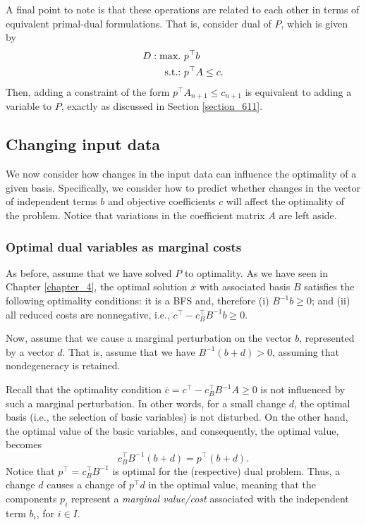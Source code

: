 A final point to note is that these operations are related to each other in terms of equivalent primal-dual formulations. That is, consider dual of $P$, which is given by
%
\begin{align*}
	D : \mathop{\text{max.~}}   & p^\top b \\
	\mathop{\text{s.t.:~}} 			& p^\top A \le c.
\end{align*}
%
Then, adding a constraint of the form $p^\top A_{n+1} \leq c_{n+1}$ is equivalent to adding a variable to $P$, exactly as discussed in Section \ref{section_611}.


\subsection{Changing input data} \label{section_613}

We now consider how changes in the input data can influence the optimality of a given basis. Specifically, we consider how to predict whether changes in the vector of independent terms $b$ and objective coefficients $c$ will affect the optimality of the problem. Notice that variations in the coefficient matrix $A$ are left aside.



\subsubsection{Optimal dual variables as marginal costs}

As before, assume that we have solved $P$ to optimality. As we have seen in Chapter \ref{chapter_4}, the optimal solution $\overline{x}$ with associated basis $B$ satisfies the following optimality conditions: it is a BFS and, therefore (i) $B^{-1}b \geq 0$; and (ii) all reduced costs are nonnegative, i.e., $c^\top - c_B^\top B^{-1}b \geq 0$.

Now, assume that we cause a marginal perturbation on the vector $b$, represented by a vector $d$. That is, assume that we have $B^{-1}(b + d) > 0$, assuming that nondegeneracy is retained.

Recall that the optimality condition $\overline{c} = c^\top - c_B ^\top B^{-1}A \geq 0$ is not influenced by such a marginal perturbation. In other words, for a small change $d$, the optimal basis (i.e., the selection of basic variables) is not disturbed. On the other hand, the optimal value of the basic variables, and consequently, the optimal value, becomes
%
\begin{equation*}
	c_B^\top B^{-1}(b + d) = p^\top(b + d). 
\end{equation*}
%
Notice that $p^\top = c_B^\top B^{-1}$ is optimal for the (respective) dual problem. Thus, a change $d$ causes a change of $p^\top d$ in the optimal value, meaning that the components $p_i$ represent a \emph{marginal value/cost} associated with the independent term $b_i$, for $i \in I$. 


